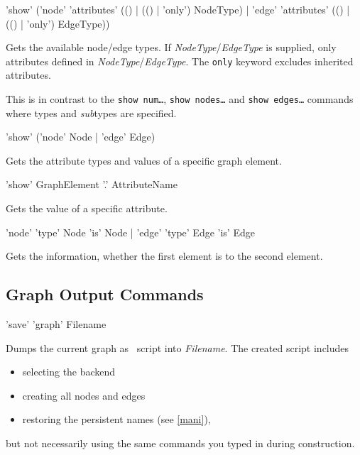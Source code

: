\begin{rail}
  'show' ('node' 'attributes' (() | (() | 'only') NodeType) | 'edge' 'attributes' (() | (() | 'only') EdgeType))
\end{rail}
Gets the available node/edge  types. If \emph{NodeType}/\emph{EdgeType} is supplied, only attributes defined in \emph{NodeType}/\emph{EdgeType}. The \texttt{only} keyword excludes inherited attributes.\\
\begin{note}
This is in contrast to the \texttt{show num\dots}, \texttt{show nodes\dots} and \texttt{show edges\dots} commands where types and \emph{sub}types are specified.
\end{note}

\begin{rail}
 'show' ('node' Node | 'edge' Edge)
\end{rail}
Gets the attribute types and values of a specific graph element.

\begin{rail}
  'show' GraphElement '.' AttributeName
\end{rail}
Gets the value of a specific attribute.

\begin{rail}
  'node' 'type' Node 'is' Node | 'edge' 'type' Edge 'is' Edge
\end{rail}
Gets the information, whether the first element is  to the second element.

\subsection{Graph Output Commands}
\label{outputcmds}

\begin{rail}
  'save' 'graph' Filename
\end{rail}
Dumps the current graph as \GrShell\ script into \emph{Filename}. The created script includes
\begin{itemize}
  \item selecting the backend
  \item creating all nodes and edges
  \item restoring the persistent names (see \ref{mani}),
\end{itemize}
but not necessarily using the same commands you typed in during construction.

